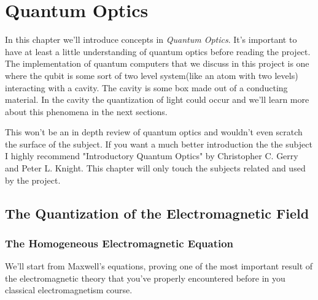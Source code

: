 \documentclass[english, a4paper, 12pt, twoside]{article}
\numberwithin{equation}{section} %
\begin{document}
\newpage
\section{Quantum Optics} \label{chap:quantum-optics}
In this chapter we'll introduce concepts in \textit{Quantum Optics}. It's important to have at least a little understanding of quantum optics before reading the project. The implementation of quantum computers that we discuss in this project is one where the qubit is some sort of two level system(like an atom with two levels) interacting with a cavity. The cavity is some box made out of a conducting material. In the cavity the quantization of light could occur and we'll learn more about this phenomena in the next sections.

This won't be an in depth review of quantum optics and wouldn't even scratch the surface of the subject. If you want a much better introduction the the subject I highly recommend "Introductory Quantum Optics" by Christopher C. Gerry and Peter L. Knight. This chapter will only touch the subjects related and used by the project.

\subsection{The Quantization of the Electromagnetic Field}
\subsubsection{The Homogeneous Electromagnetic Equation}
We'll start from Maxwell's equations, proving one of the most important result of the electromagnetic theory that you've properly encountered before in you classical electromagnetism course.
\end{document}
